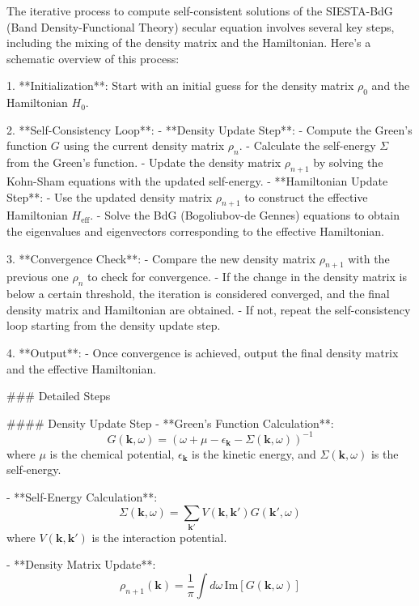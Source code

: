 The iterative process to compute self-consistent solutions of the \textsc{SIESTA}-BdG (Band Density-Functional Theory) secular equation involves several key steps, including the mixing of the density matrix and the Hamiltonian. Here's a schematic overview of this process:

1. **Initialization**: Start with an initial guess for the density matrix \( \rho_0 \) and the Hamiltonian \( H_0 \).

2. **Self-Consistency Loop**:
   - **Density Update Step**:
     - Compute the Green's function \( G \) using the current density matrix \( \rho_n \).
     - Calculate the self-energy \( \Sigma \) from the Green's function.
     - Update the density matrix \( \rho_{n+1} \) by solving the Kohn-Sham equations with the updated self-energy.
   - **Hamiltonian Update Step**:
     - Use the updated density matrix \( \rho_{n+1} \) to construct the effective Hamiltonian \( H_{\text{eff}} \).
     - Solve the BdG (Bogoliubov-de Gennes) equations to obtain the eigenvalues and eigenvectors corresponding to the effective Hamiltonian.

3. **Convergence Check**:
   - Compare the new density matrix \( \rho_{n+1} \) with the previous one \( \rho_n \) to check for convergence.
   - If the change in the density matrix is below a certain threshold, the iteration is considered converged, and the final density matrix and Hamiltonian are obtained.
   - If not, repeat the self-consistency loop starting from the density update step.

4. **Output**:
   - Once convergence is achieved, output the final density matrix and the effective Hamiltonian.

### Detailed Steps

#### Density Update Step
- **Green's Function Calculation**:
  \[
  G(\mathbf{k}, \omega) = \left( \omega + \mu - \epsilon_{\mathbf{k}} - \Sigma(\mathbf{k}, \omega) \right)^{-1}
  \]
  where \( \mu \) is the chemical potential, \( \epsilon_{\mathbf{k}} \) is the kinetic energy, and \( \Sigma(\mathbf{k}, \omega) \) is the self-energy.

- **Self-Energy Calculation**:
  \[
  \Sigma(\mathbf{k}, \omega) = \sum_{\mathbf{k}'} V(\mathbf{k}, \mathbf{k}') G(\mathbf{k}', \omega)
  \]
  where \( V(\mathbf{k}, \mathbf{k}') \) is the interaction potential.

- **Density Matrix Update**:
  \[
  \rho_{n+1}(\mathbf{k}) = \frac{1}{\pi} \int d\omega \, \text{Im} \left[ G(\mathbf{k}, \omega) \right]
  \]

